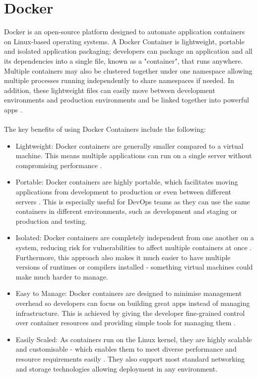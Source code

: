 \documentclass[BIF,Bachelor,nenglish]{twbook}%
\begin{document}
\section{Docker}
Docker is an open-source platform designed to automate application containers on Linux-based operating systems. A Docker Container is lightweight, portable and isolated application packaging; developers can package an application and all its dependencies into a single file, known as a "container", that runs anywhere. Multiple containers may also be clustered together under one namespace allowing multiple processes running independently to share namespaces if needed. In addition, these lightweight files can easily move between development environments and production environments and be linked together into powerful apps \cite{rad2017}.
\\
\\
The key benefits of using Docker Containers include the following:

\begin{itemize}
\item Lightweight: Docker containers are generally smaller compared to a virtual machine. This means multiple applications can run on a single server without compromising performance \cite{vmwcovsvm}.

\item Portable: Docker containers are highly portable, which facilitates moving applications from development to production or even between different servers \cite{rad2017} . This is especially useful for DevOps teams as they can use the same containers in different environments, such as development and staging or production and testing.

\item Isolated: Docker containers are completely independent from one another on a system, reducing risk for vulnerabilities to affect multiple containers at once \cite{com2016} . Furthermore, this approach also makes it much easier to have multiple versions of runtimes or compilers installed - something virtual machines could make much harder to manage.

\item Easy to Manage: Docker containers are designed to minimise management overhead so developers can focus on building great apps instead of managing infrastructure. This is achieved by giving the developer fine-grained control over container resources and providing simple tools for managing them \cite{rad2017}.

\item Easily Scaled: As containers run on the Linux kernel, they are highly scalable and customisable - which enables them to meet diverse performance and resource requirements easily \cite{rad2017}. They also support most standard networking and storage technologies allowing deployment in any environment.
\end{itemize}
\end{document}
